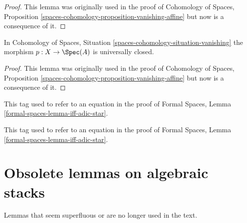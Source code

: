 \begin{proof}
This lemma was originally used in the proof of
Cohomology of Spaces, Proposition
\ref{spaces-cohomology-proposition-vanishing-affine}
but now is a consequence of it.
\end{proof}

\begin{lemma}
\label{lemma-vanishing-universally-closed}
In Cohomology of Spaces, Situation \ref{spaces-cohomology-situation-vanishing}
the morphism $p : X \to \Spec(A)$ is universally closed.
\end{lemma}

\begin{proof}
This lemma was originally used in the proof of
Cohomology of Spaces, Proposition
\ref{spaces-cohomology-proposition-vanishing-affine}
but now is a consequence of it.
\end{proof}

\begin{remark}
\label{remark-equation-first}
This tag used to refer to an equation in the proof of
Formal Spaces, Lemma \ref{formal-spaces-lemma-iff-adic-star}.
\end{remark}

\begin{remark}
\label{remark-equation-second}
This tag used to refer to an equation in the proof of
Formal Spaces, Lemma \ref{formal-spaces-lemma-iff-adic-star}.
\end{remark}





\section{Obsolete lemmas on algebraic stacks}
\label{section-obsolete-on-stacks}

\noindent
Lemmas that seem superfluous or are no longer used in the text.

